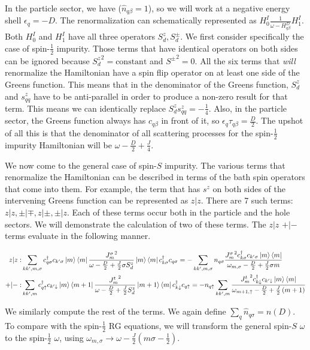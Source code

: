 \documentclass[reprint,prb,superscriptaddress]{revtex4-2}
\begin{document}
In the particle sector, we have (\(\hat n_{q\beta}=1\)), so we will work at a negative energy  shell \(\epsilon_q = -D\). The renormalization can schematically represented as \(H^I_0 \frac{1}{\omega - H^D_{q\beta}} H^I_1\). Both \(H^I_0\) and \(H^I_1\) have all three operators \(S_d^z, S_d^\pm\). We first consider specifically the case of spin-\(\frac{1}{2}\) impurity. Those terms that have identical operators on both sides can be ignored because \({S_d^z}^2 = \text{constant}\) and \({S^\pm}^2 = 0\). All the six terms that \textit{will} renormalize the Hamiltonian have a spin flip operator on at least one side of the Greens function. This means that in the denominator of the Greens function, \(S_d^z\) and \(s^z_{qq}\) have to be anti-parallel in order to produce a non-zero result for that term. This means we can identically replace \(S_d^z s^z_{qq} = -\frac{1}{4}\). Also, in the particle sector, the Greens function always has \(c_{q\beta}\) in front of it, so \(\epsilon_q \tau_{q\beta} = \frac{D}{2}\). The upshot of all this is that the denominator of all scattering processes for the spin-\(\frac{1}{2}\) impurity Hamiltonian will be \(\omega - \frac{D}{2} + \frac{J}{4}\).

We now come to the general case of spin-\(S\) impurity. The various terms that renormalize the Hamiltonian can be described in terms of the bath spin operators that come into them. For example, the term that has \(s^z\) on both sides of the intervening Greens function can be represented as \(z|z\). There are 7 such terms: \(z|z, \pm|\mp, z|\pm, \pm|z\). Each of these terms occur both in the particle and the hole sectors. We will demonstrate the calculation of two of these terms. The \(z|z\) \(+|-\) terms evaluate in the following manner.
\begin{widetext}
\begin{align}
	z|z: & \sum_{kk^\prime,m,\sigma} c^\dagger_{q \sigma} c_{k^\prime \sigma} \ket{m}\bra{m}\frac{{J^\sigma_m}^2}{\omega - \frac{D}{2} + \frac{J}{2}\sigma S_d^z}\ket{m}\bra{m} c^\dagger_{k \sigma}c_{q \sigma} = -\sum_{kk^\prime,m,\sigma}n_{q \sigma}\frac{{J^\sigma_m}^2 c^\dagger_{k \sigma}c_{k^\prime\sigma} \ket{m}\bra{m}}{\omega_{m, \sigma} - \frac{D}{2} + \frac{J}{2}\sigma m}\\
	+|-: & \sum_{kk^\prime,m} c^\dagger_{q \uparrow} c_{k^\prime \downarrow} \ket{m}\bra{m+1}\frac{{J^t_m}^2}{\omega - \frac{D}{2} + \frac{J}{2}S_d^z}\ket{m+1}\bra{m} c^\dagger_{k \downarrow}c_{q \uparrow} = -n_{q \uparrow}\sum_{kk^\prime,m}\frac{{J^t_m}^2 c^\dagger_{k \downarrow}c_{k^\prime\downarrow} \ket{m}\bra{m}}{\omega_{m+1, \uparrow} - \frac{D}{2} + \frac{J}{2}\left( m+1 \right) }
\end{align}
\end{widetext}
We similarly compute the rest of the terms. We again define \(\sum_q \hat n_{q\sigma} = n(D)\). To compare with the spin-\(\frac{1}{2}\) RG equations, we will transform the general spin-\(S\) \(\omega\) to the spin-\(\frac{1}{2}\) \( \omega\), using \(\omega_{m,\sigma} \to \omega - \frac{J}{2}\left(m\sigma - \frac{1}{2}\right)\).
\end{document}
